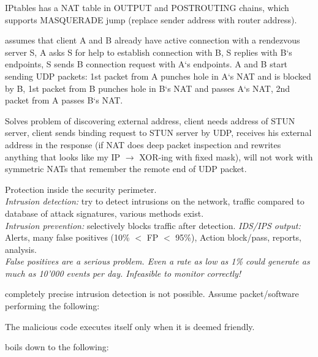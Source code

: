  IPtables has a NAT table in OUTPUT and POSTROUTING chains, which supports MASQUERADE jump (replace sender address with router address).

 assumes that client A and B already have active connection with a rendezvous server S, A asks S for help to establish connection with B, S replies with B‘s endpoints, S sends B connection request with A‘s endpoints. A and B start sending UDP packets: 1st packet from A punches hole in A‘s NAT and is blocked by B, 1st packet from B punches hole in B‘s NAT and passes A‘s NAT, 2nd packet from A passes B‘s NAT.

 Solves problem of discovering external address, client needs address of STUN server, client sends binding request to STUN server by UDP, receives his external address in the response (if NAT does deep packet inspection and rewrites anything that looks like my IP $\to$ XOR-ing with fixed mask), will not work with symmetric NATs that remember the remote end of UDP packet.

 Protection inside the security perimeter.\\
\emph{Intrusion detection:} try to detect intrusions on the network, traffic compared to database of attack signatures, various methods exist.\\
\emph{Intrusion prevention:} selectively blocks traffic after detection.
\emph{IDS/IPS output:} Alerts, many false positives (10\% $<$ FP $<$ 95\%), Action block/pass, reports, analysis.\\

\emph{False positives are a serious problem. Even a rate as low as 1\% could generate as much as 10'000 events per day. Infeasible to monitor correctly!}

 completely precise intrusion detection is not possible. Assume packet/software performing the following:

The malicious code executes itself only when it is deemed friendly.

 boils down to the following:

